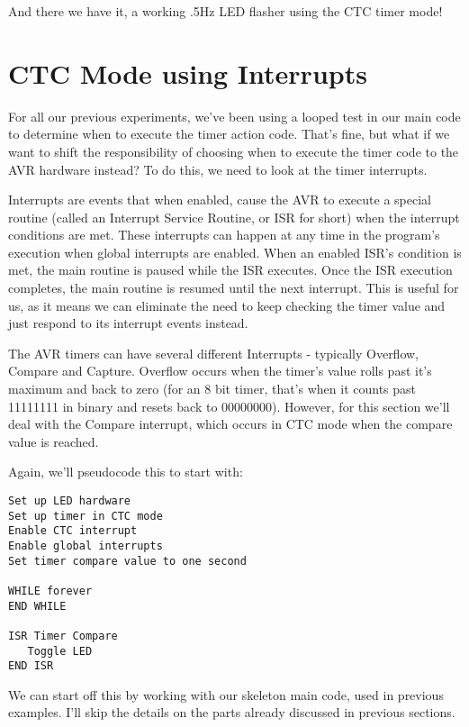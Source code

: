 \documentclass[a4paper,oneside,notitlepage]{book}
\begin{document}
And there we have it, a working .5Hz LED flasher using the CTC timer mode!


\label{chp:CTCInt}
\chapter{CTC Mode using Interrupts}

For all our previous experiments, we've been using a looped test in our main code to determine when to execute the timer action code. That's fine, but what if we want to shift the responsibility of choosing when to execute the timer code to the AVR hardware instead? To do this, we need to look at the timer interrupts.

Interrupts are events that when enabled, cause the AVR to execute a special routine (called an Interrupt Service Routine, or ISR for short) when the interrupt conditions are met. These interrupts can happen at any time in the program's execution when global interrupts are enabled. When an enabled ISR's condition is met, the main routine is paused while the ISR executes. Once the ISR execution completes, the main routine is resumed until the next interrupt. This is useful for us, as it means we can eliminate the need to keep checking the timer value and just respond to its interrupt events instead.

The AVR timers can have several different Interrupts - typically Overflow, Compare and Capture. Overflow occurs when the timer's value rolls past it's maximum and back to zero (for an 8 bit timer, that's when it counts past 11111111 in binary and resets back to 00000000). However, for this section we'll deal with the Compare interrupt, which occurs in CTC mode when the compare value is reached.

Again, we'll pseudocode this to start with:

\begin{center}
\begin{lstlisting}[keywordstyle=\color{black},commentstyle=\color{black}]
Set up LED hardware
Set up timer in CTC mode
Enable CTC interrupt
Enable global interrupts
Set timer compare value to one second

WHILE forever
END WHILE

ISR Timer Compare
   Toggle LED
END ISR
\end{lstlisting}
\end{center}

We can start off this by working with our skeleton main code, used in previous examples. I'll skip the details on the parts already discussed in previous sections.
\end{document}
